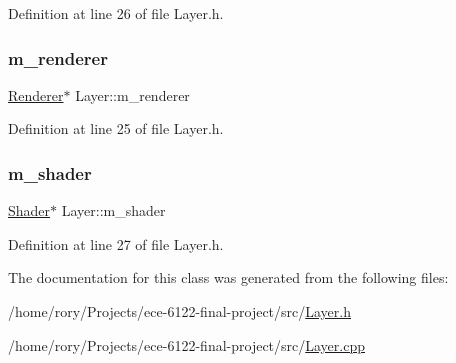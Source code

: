 Definition at line 26 of file Layer.\+h.

\mbox{\label{class_layer_a37e53fc9b8764c7fa4b69de8f037a76f}} 
\subsubsection{\texorpdfstring{m\+\_\+renderer}{m\_renderer}}
{\footnotesize\ttfamily \hyperlink{class_renderer}{Renderer}$\ast$ Layer\+::m\+\_\+renderer\hspace{0.3cm}{\ttfamily [protected]}}



Definition at line 25 of file Layer.\+h.

\mbox{\label{class_layer_aa7cd5a12a7862c9127316d065278f5cc}} 
\subsubsection{\texorpdfstring{m\+\_\+shader}{m\_shader}}
{\footnotesize\ttfamily \hyperlink{class_shader}{Shader}$\ast$ Layer\+::m\+\_\+shader\hspace{0.3cm}{\ttfamily [protected]}}



Definition at line 27 of file Layer.\+h.



The documentation for this class was generated from the following files\+:\begin{DoxyCompactItemize}
\item 
/home/rory/\+Projects/ece-\/6122-\/final-\/project/src/\hyperlink{_layer_8h}{Layer.\+h}\item 
/home/rory/\+Projects/ece-\/6122-\/final-\/project/src/\hyperlink{_layer_8cpp}{Layer.\+cpp}\end{DoxyCompactItemize}
